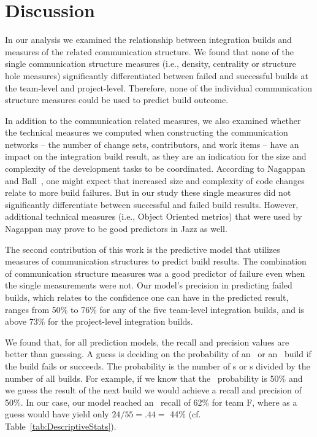 \section{Discussion}
\label{sec:discussion5}
In our analysis we examined the relationship between integration builds and
measures of the related communication structure. We found that none of the single
communication structure measures (i.e., density, centrality or structure hole measures)
significantly differentiated between failed and successful builds at the
team-level and project-level. Therefore, none of the individual communication
structure measures could be used to predict build outcome.

In addition to the communication related measures, we also examined whether the
technical measures we computed when constructing the communication networks --
the number of change sets, contributors, and work items -- have an impact on the
integration build result, as they are an indication for the size and complexity
of the development tasks to be coordinated. According to Nagappan and
Ball~\cite{nagappan:icse:2005}, one might expect that increased size and complexity
of code changes relate to more build failures. But in our study these single
measures did not significantly differentiate between successful and failed build
results. However, additional technical measures (i.e., Object Oriented metrics) that were used by Nagappan may prove to be good predictors in Jazz as well.

The second contribution of this work is the predictive model that utilizes measures
of communication structures to predict build results. The
combination of communication structure measures was a good predictor of failure
even when the single measurements were not. Our model's precision in predicting
failed builds, which relates to the confidence one can have in the predicted
result, ranges from 50\% to 76\% for any of the five team-level integration
builds, and is above 73\% for the project-level integration builds.

We found that, for all prediction models, the recall and precision values are
better than guessing. A guess is deciding on the probability of an \error\ or an
\ok\ build if the build fails or succeeds. The probability is the number of
\error s or \ok s divided by the number of all builds. For example, if we know
that the \error\ probability is 50\% and we guess the result of the next build we
would achieve a recall and precision of 50\%. In our case, our model reached an
\error\ recall of 62\% for team F, where as a guess would have yield only
$24/55=.44=$ 44\% (cf. Table~\ref{tab:DescriptiveStats}).

